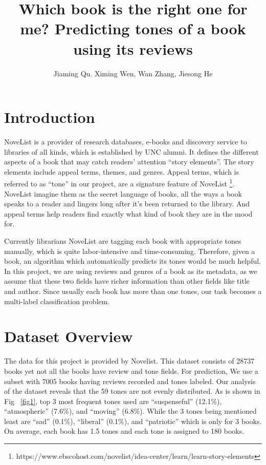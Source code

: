 \documentclass[runningheads]{llncs}
\begin{document}
%
\title{Which book is the right one for me? \newline  Predicting tones of a book using its reviews}
%
%
\author{Jiaming Qu. Ximing Wen, Wan Zhang, Jiesong He}
%
%
\maketitle              %
%

\section{Introduction}

NoveList is a provider of research databases, e-books and discovery service to libraries of all kinds, which is established by UNC alumni. It defines the different aspects of a book that may catch readers’ attention ``story elements''. The story elements include appeal terms, themes, and genres. Appeal terms, which is referred to as ``tone'' in our project, are a signature feature of NoveList \footnote{https://www.ebscohost.com/novelist/idea-center/learn/learn-story-elements}. NoveList imagine them as the secret language of books, all the ways a book speaks to a reader and lingers long after it’s been returned to the library. And appeal terms help readers find exactly what kind of book they are in the mood for.\par

Currently librarians NoveList are tagging each book with appropriate tones manually, which is quite labor-intensive and time-consuming. Therefore, given a book, an algorithm which automatically predicts its tones would be much helpful. In this project, we are using reviews and genres of a book as its metadata, as we assume that these two fields have richer information than other fields like title and author. Since usually each book has more than one tones, our task becomes a multi-label classification problem.

\section{Dataset Overview}
The data for this project is provided by Novelist. This dataset consists of 28737 books yet not all the books have review and tone fields. For prediction, We use a subset with 7005 books having reviews recorded and tones labeled. Our analysis of the dataset reveals that the 59 tones are not evenly distributed. As is shown in Fig ~\ref{fig1}, top 3 most frequent tones used are ``suspenseful'' (12.1\%), ``atmospheric'' (7.6\%), and ``moving'' (6.8\%). While the 3 tones being mentioned least are ``sad'' (0.1\%), ``liberal'' (0.1\%), and ``patriotic'' which is only for 3 books. On average, each book has 1.5 tones and each tone is assigned to 180 books.
\end{document}
